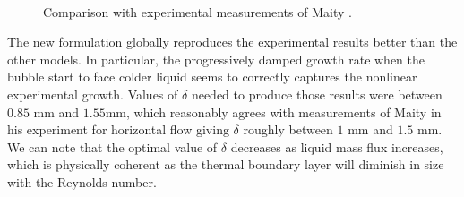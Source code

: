 \begin{figure}[h!]
\\
\caption{Comparison with experimental measurements of Maity  \cite{maity_effect_2000}.}
\label{fig:growth_comp_maity}
\end{figure}

\npar

The new formulation globally reproduces the experimental results better than the other models. In particular, the progressively damped growth rate when the bubble start to face colder liquid seems to correctly captures the nonlinear experimental growth. Values of $\delta$ needed to produce those results were between $0.85$ mm and $1.55$mm, which reasonably agrees with measurements of Maity in his experiment for horizontal flow giving $\delta$ roughly between $1$ mm and $1.5$ mm. We can note that the optimal value of $\delta$ decreases as liquid mass flux increases, which is physically coherent as the thermal boundary layer will diminish in size with the Reynolds number.

